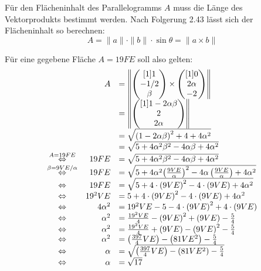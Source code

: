\documentclass[main.tex]{subfiles}
\begin{document}
Für den Flächeninhalt des Parallelogramms $A$ muss die Länge des Vektorprodukts bestimmt werden. Nach Folgerung 2.43 lässt sich der Flächeninhalt so berechnen:
\begin{equation*}
    A=\| a\| \cdotp \| b\| \cdotp \sin \theta =\| a\times b\| 
\end{equation*}

Für eine gegebene Fläche $A=19FE$ soll also gelten:
\begin{equation*}
    \begin{array}{ c r l }
    & A & = \left\| \begin{pmatrix}[1]
    1\\
    -1/2\\
    \beta 
    \end{pmatrix} \times \begin{pmatrix}[1]
    0\\
    2\alpha \\
    -2
    \end{pmatrix} \right\| \\
    &  & = \left\| \begin{pmatrix}[1]
    1-2\alpha \beta \\
    2\\
    2\alpha 
    \end{pmatrix} \right\| \\
    &  & =\sqrt{{( 1-2\alpha \beta )}^{2} +4+4\alpha ^{2}}\\
    &  & =\sqrt{5+4\alpha ^{2} \beta ^{2} -4\alpha \beta +4\alpha ^{2}}\\
    \overset{A=19FE}{\Leftrightarrow } & 19FE & =\sqrt{5+4\alpha ^{2} \beta ^{2} -4\alpha \beta +4\alpha ^{2}}\\
    \overset{\beta =9VE/\alpha }{\Leftrightarrow } & 19FE & =\sqrt{5+4\alpha ^{2}{\left(\frac{9VE}{\alpha }\right)}^{2} -4\alpha \left(\frac{9VE}{\alpha }\right) +4\alpha ^{2}}\\
    \Leftrightarrow  & 19FE & =\sqrt{5+4\cdotp {( 9VE)}^{2} -4\cdotp ( 9VE) +4\alpha ^{2}}\\
    \Leftrightarrow  & 19^{2} VE & =5+4\cdotp {( 9VE)}^{2} -4\cdotp ( 9VE) +4\alpha ^{2}\\
    \Leftrightarrow  & 4\alpha ^{2} & =19^{2} VE-5-4\cdotp {( 9VE)}^{2} +4\cdotp ( 9VE)\\
    \Leftrightarrow  & \alpha ^{2} & =\frac{19^{2} VE}{4} -{( 9VE)}^{2} +( 9VE) -\frac{5}{4}\\
    \Leftrightarrow  & \alpha ^{2} & =\frac{19^{2} VE}{4} +( 9VE) -{( 9VE)}^{2} -\frac{5}{4}\\
    \Leftrightarrow  & \alpha ^{2} & =\left(\frac{397}{4} VE\right) -\left( 81VE^{2}\right) -\frac{5}{4}\\
    \Leftrightarrow  & \alpha  & =\sqrt{\left(\frac{397}{4} VE\right) -\left( 81VE^{2}\right) -\frac{5}{4}}\\
    \Leftrightarrow  & \alpha  & =\sqrt{17}
    \end{array}
\end{equation*}
\end{document}

